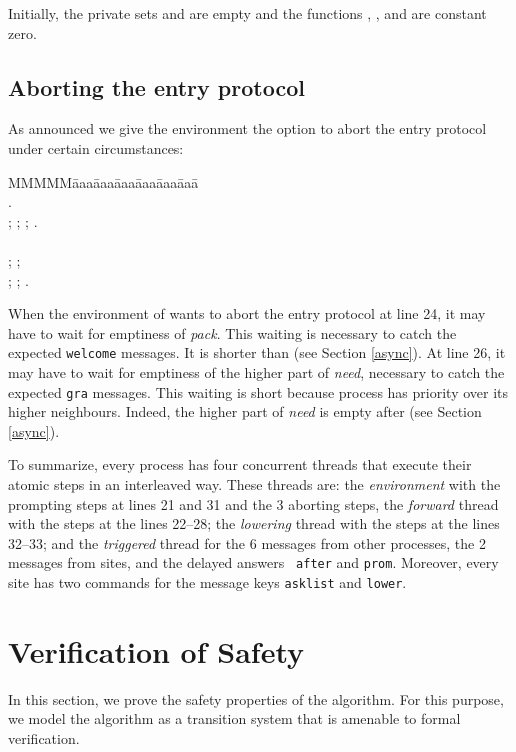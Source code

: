 \documentclass[10pt]{article} \usepackage[english]{babel}
\newenvironment{tab}{\begin{tabbing}
MMMMM\=aaa\=aaa\=aaa\=aaa\=aaa\=aaa\= \kill}{\end{tabbing}}
\def\S #1/{\mbox {\textsl{#1}}}
\def\T #1/{\mbox {\texttt{#1}}}
\begin{document}
Initially, the private sets  and  are empty
and the functions , , and  are
constant zero.

\subsection{Aborting the entry protocol} \label{s.abort}

As announced we give the environment the option to abort the entry
protocol under certain circumstances:

\begin{tab}
  \>  \+\+\\
   .\\
   ; 
   ;  ;  .\\
   \\
  \>\>  ;
   ; \\
  \>\>  ;  ;  .
\end{tab}

When the environment of  wants to abort the entry protocol at line
24, it may have to wait for emptiness of \S pack/.  This waiting is
necessary to catch the expected \T welcome/ messages.  It is shorter
than  (see Section \ref{async}).  At line 26, it may have to
wait for emptiness of the higher part of \S need/, necessary to catch
the expected \T gra/ messages.  This waiting is short because process
 has priority over its higher neighbours. Indeed, the higher part
of \S need/ is empty after  (see Section
\ref{async}).

To summarize, every process  has four concurrent threads that
execute their atomic steps in an interleaved way.  These threads are:
the \emph{environment} with the prompting steps at lines 21 and 31 and
the 3 aborting steps, the \emph{forward} thread with the steps at the
lines 22--28; the \emph{lowering} thread with the steps at the lines
32--33; and the \emph{triggered} thread for the 6 messages from other
processes, the 2 messages from sites, and the delayed answers \T
after/ and \T prom/.  Moreover, every site has two commands for the
message keys \T asklist/ and \T lower/.

\section{Verification of Safety}
\label{algorithm}

In this section, we prove the safety properties of the algorithm.  For
this purpose, we model the algorithm as a transition system that is
amenable to formal verification.
\end{document}

